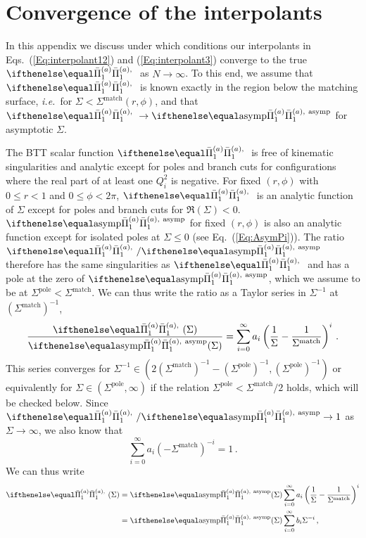 \section{Convergence of the interpolants}
\label{App:Convergence}
In this appendix we discuss under which conditions our interpolants in Eqs.~(\ref{Eq:interpolant12}) and (\ref{Eq:interpolant3}) converge to the true $\PiPS$ as $N\to \infty$. To this end, we assume that $\PiPS$ is known exactly in the region below the matching surface, {\it i.e.}\ for $\Sigma < \Sigma^\text{match}(r,\phi)$, and that $\PiPS \to \PiPS[\text{asymp}]$ for asymptotic $\Sigma$.

The BTT scalar function $\PiPS$ is free of kinematic singularities and analytic except for poles and branch cuts for configurations where the real part of at least one $Q_i^2$ is negative. For fixed $(r,\phi)$ with $0 \le r < 1$ and $0 \le \phi < 2\pi$, $\PiPS$ is an analytic function of $\Sigma$ except for poles and branch cuts for $\Re(\Sigma) < 0$. $\PiPS[\text{asymp}]$ for fixed $(r,\phi)$ is also an analytic function except for isolated poles at $\Sigma \leq 0$ (see Eq.~(\ref{Eq:AsymPi})). The ratio $\PiPS / \PiPS[\text{asymp}]$ therefore has the same singularities as $\PiPS$ and has a pole at the zero of $\PiPS[\text{asymp}]$, which we assume to be at $\Sigma^\text{pole} < \Sigma^\text{match}$.
We can thus write the ratio as a Taylor series in $\Sigma^{-1}$ at $(\Sigma^\text{match})^{-1}$,
\begin{equation}
\frac{\PiPS(\Sigma)}{\PiPS[\text{asymp}](\Sigma)} = \sum_{i=0}^{\infty} a_i \left(\frac{1}{\Sigma} - \frac{1}{\Sigma^\text{match}}\right)^i\,.
\end{equation}
This series converges for $\Sigma^{-1} \in (2(\Sigma^\text{match})^{-1} - (\Sigma^\text{pole})^{-1},\allowbreak (\Sigma^\text{pole})^{-1})$ or equivalently for $\Sigma \in (\Sigma^\text{pole}, \infty)$ if the relation $\Sigma^\text{pole} < \Sigma^\text{match}/2$ holds, which will be checked below. Since $\PiPS / \PiPS[\text{asymp}] \to 1$ as $\Sigma \to \infty$, we also know that
\begin{equation}
\sum_{i=0}^\infty a_i \left(-\Sigma^\text{match}\right)^{-i} = 1\,.
\label{Eq:AppAsymp}
\end{equation}
We can thus write
\begin{equation}
\begin{aligned}
\PiPS(\Sigma) &= \PiPS[\text{asymp}](\Sigma) \sum_{i=0}^{\infty} a_i \left(\frac{1}{\Sigma} - \frac{1}{\Sigma^\text{match}}\right)^i \\
&= \PiPS[\text{asymp}](\Sigma) \sum_{i=0}^{\infty} b_i \Sigma^{-i}\,,
\end{aligned}
\label{Eq:AppAsympSeries}
\end{equation}
